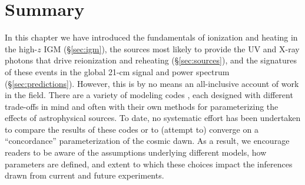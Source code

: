 %



\section{Summary}
In this chapter we have introduced the fundamentals of ionization and heating in the high-$z$ IGM (\S\ref{sec:igm}), the sources most likely to provide the UV and X-ray photons that drive reionization and reheating (\S\ref{sec:sources}), and the signatures of these events in the global 21-cm signal and power spectrum (\S\ref{sec:predictions}). However, this is by no means an all-inclusive account of work in the field. There are a variety of modeling codes \cite{Furlanetto2004,Barkana2005,Pritchard2007,Thomas2009,Mesinger2011,Fialkov2014a,Mirocha2014,Santos2010,Raste2018}, each designed with different trade-offs in mind and often with their own methods for parameterizing the effects of astrophysical sources. To date, no systematic effort has been undertaken to compare the results of these codes or to (attempt to) converge on a ``concordance'' parameterization of the cosmic dawn. As a result, we encourage readers to be aware of the assumptions underlying different models, how parameters are defined, and extent to which these choices impact the inferences drawn from current and future experiments.






